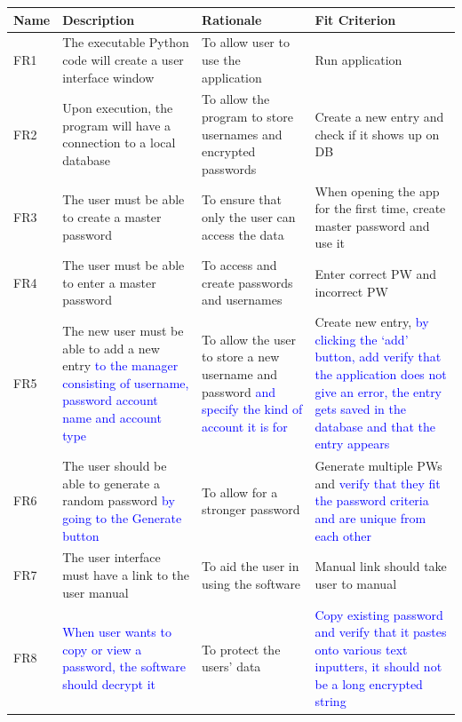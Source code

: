 \documentclass[12pt, titlepage]{article}
\begin{document}
\begin{table}[H]
\centering
{}
\small
\begin{tabular}{ | p{1cm} | p{4cm} | p{4cm} | p{4cm} | }
	\hline
	Name & Description & Rationale & Fit Criterion\\
	\hline
	FR1 & The executable Python code will create a user interface window & To allow user to use the application & Run application \\
	\hline
	FR2 & Upon execution, the program will have a connection to a local database & To allow the program to store usernames and encrypted passwords & Create a new entry and check if it shows up on DB \\
	\hline
	FR3 & The user must be able to create a master password & To ensure that only the user can access the data & When opening the app for the first time, create master password and use it \\
	\hline
	FR4 & The user must be able to enter a master password & To access and create passwords and usernames & Enter correct PW and incorrect PW \\
	\hline
	FR5 & The new user must be able to add a new entry \textcolor{blue}{to the manager consisting of username, password account name and account type} & To allow the user to store a new username and password \textcolor{blue}{and specify the kind of account it is for} & Create new entry, \textcolor{blue}{by clicking the ‘add’ button, add verify that the application does not give an error, the entry gets saved in the database and that the entry appears} \\
	\hline
	FR6 & The user should be able to generate a random password \textcolor{blue}{ by going to the Generate button} & To allow for a stronger password & Generate multiple PWs and \textcolor{blue}{verify that they fit the password criteria and are unique from each other} \\
	\hline
	FR7 & The user interface must have a link to the user manual & To aid the user in using the software & Manual link should take user to manual \\
	\hline
	FR8 & \textcolor{blue}{When user wants to copy or view a password, the software should decrypt it} & To protect the users’ data & \textcolor{blue}{Copy existing password and verify that it pastes onto various text inputters, it should not be a long encrypted string} \\
\hline
\end{tabular}
\end{table}
\end{document}
